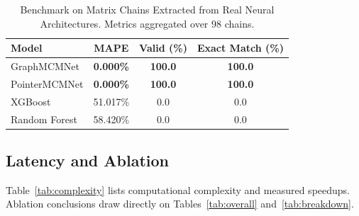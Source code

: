 \documentclass[conference]{IEEEtran}
\begin{document}
\begin{table}[htbp]
\caption{Benchmark on Matrix Chains Extracted from Real Neural Architectures. Metrics aggregated over 98 chains.}
\label{tab:realarch}
\begin{center}
\renewcommand{\arraystretch}{1.3}
\setlength{\tabcolsep}{8pt}
\begin{tabular}{@{}lccc@{}}
\toprule
\textbf{Model} & \textbf{MAPE} & \textbf{Valid (\%)} & \textbf{Exact Match (\%)} \\
\midrule
GraphMCMNet   & \textbf{0.000\%} & \textbf{100.0} & \textbf{100.0} \\
PointerMCMNet & \textbf{0.000\%} & \textbf{100.0} & \textbf{100.0} \\
XGBoost       & 51.017\%         & 0.0            & 0.0            \\
Random Forest & 58.420\%         & 0.0            & 0.0            \\
\bottomrule
\end{tabular}
\end{center}
\end{table}

\subsection{Latency and Ablation}
\label{sec:sigablation}

Table~\ref{tab:complexity} lists computational complexity and measured speedups. Ablation conclusions draw directly on Tables~\ref{tab:overall} and~\ref{tab:breakdown}.
\end{document}
